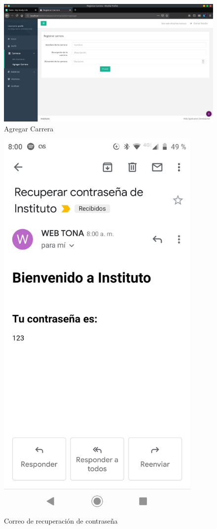 \documentclass[a4paper,12pt]{article}
\begin{document}
\begin{figure}[H]
\begin{center}
 \includegraphics[width=\textwidth]{agregar_carrera.png}
 \caption{Agregar Carrera}
 \label{fig:agregar_carrera}
\end{center}
\end{figure}

\begin{figure}[H]
\begin{center}
 \includegraphics[width=10cm]{contra.png}
 \caption{Correo de recuperación de contraseña}
 \label{fig:contra}
\end{center}
\end{figure}
\end{document}
